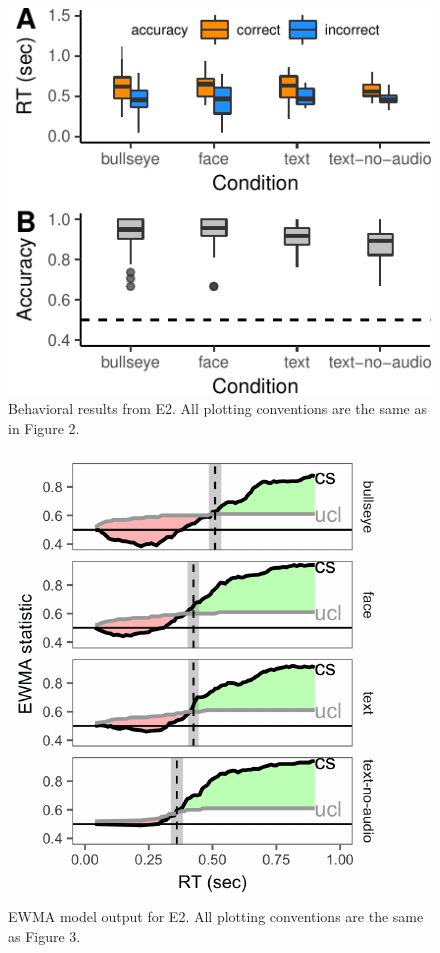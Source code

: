 \documentclass[10pt, letterpaper]{article}
\newenvironment{CodeChunk}{}{}
\begin{document}
\begin{CodeChunk}
\begin{figure}[t]

{\centering \includegraphics{figs/e2_plot_print-1} 

}

\caption[Behavioral results from E2]{Behavioral results from E2. All plotting conventions are the same as in Figure 2.}\label{fig:e2_plot_print}
\end{figure}
\end{CodeChunk}

\begin{CodeChunk}
\begin{figure}[t]

{\centering \includegraphics{figs/e2_control_chart-1} 

}

\caption[EWMA model output for E2]{EWMA model output for E2. All plotting conventions are the same as Figure 3.}\label{fig:e2_control_chart}
\end{figure}
\end{CodeChunk}
\end{document}
